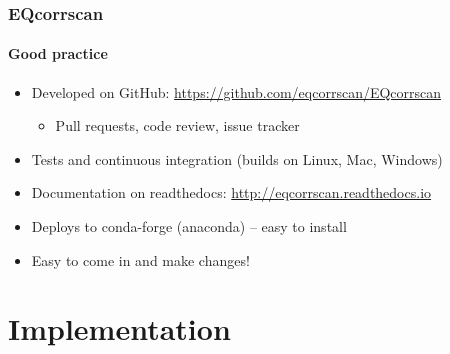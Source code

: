 \documentclass[aspectratio=169]{beamer}
\begin{document}
\begin{frame}[t]
    \frametitle{EQcorrscan}
    \framesubtitle{Good practice}
    
    
    \begin{itemize}
      \item Developed on GitHub: \url{https://github.com/eqcorrscan/EQcorrscan}
        \begin{itemize}
            \item Pull requests, code review, issue tracker
        \end{itemize}
      \item Tests and continuous integration (builds on Linux, Mac, Windows)
      \item Documentation on readthedocs: \url{http://eqcorrscan.readthedocs.io}
      \item Deploys to conda-forge (anaconda) -- easy to install
      \item Easy to come in and make changes!
    \end{itemize}

\end{frame}


\section{Implementation}
\end{document}
